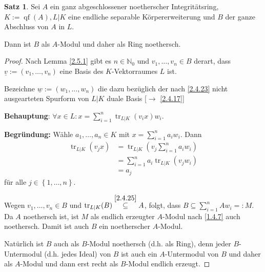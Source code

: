 \documentclass[
twoside=semi,
fontsize=12,
DIV=12, 
cleardoublepage=current,
leqno,
headings=optiontoheadandtoc, 
toc=idx
]{scrbook}
\newcommand{\N}{\mathbb{N}}
\newcommand{\brac}[1]{\left( #1 \right)}
\newcommand{\set}[1]{\left\{ #1 \right\}}
\DeclareMathOperator{\qf}{qf}
\DeclareMathOperator{\tr}{tr}
\theoremstyle{definition}
\newtheorem{satz}[definition]{Satz}
\begin{document}
 	\begin{satz}\label{2.5.2}\hfill\newline
 		Sei $A$ ein ganz abgeschlossener noetherscher Integrit\"atsring, $K:= \qf(A), L|K$ eine endliche separable K\"orpererweiterung und $B$ der ganze Abschluss von $A$ in $L$.
 		
 		\medskip\noindent 
 		Dann ist $B$ als $A$-Modul und daher als Ring noethersch.
 		
 		\begin{proof}
 			Nach Lemma \ref{2.5.1} gibt es $n \in \N_0$ und $v_1, \dots, v_n \in B$ derart, dass \linebreak $\underline{v} := (v_1, \dots, v_n)$ eine Basis des $K$-Vektorraumes $L$ ist.
 			
 			Bezeichne $\underline{w} := (w_1, \dots, w_n)$ die dazu bez\"uglich der nach \ref{2.4.23} nicht ausgearteten Spurform von $L|K$ duale Basis [$\to$ \ref{2.4.17}]
 			
 			{\color{red}
 			\noindent
 			\textbf{Behauptung}: $\forall x \in L: x = \sum_{i=1}^{n} \tr_{L|K}(v_ix)w_i$.
 			
 			\smallskip\noindent
 			\textbf{Begr\"undung: } W\"ahle $a_1, \dots, a_n \in K$ mit $x = \sum_{i=1}^{n} a_iw_i$. Dann 
 			\begin{align*}
 				\tr_{L|K}(v_jx) &= \tr_{L|K}\brac{v_j\sum_{i=1}^{n}a_iw_i}\\
 				&= \sum_{i=1}^{n} a_i\tr_{L|K}(v_jw_i)\\
 				&= a_j
 			\end{align*}
 			f\"ur alle $j \in \set{1,\dots, n}$.
 			}
 		
 			\medskip\noindent
 			Wegen $v_1, \dots, v_n \in B$ und $\tr_{L|K}(B) \overset{\ref{2.4.25}}{\subseteq} A$, folgt, dass $B \subseteq \sum_{i=1}^{n} Aw_i =: M$. Da $A$ noethersch ist,
 			ist $M$ als endlich erzeugter $A$-Modul nach \ref{1.4.7} auch noethersch. Damit ist auch $B$ ein noetherscher $A$-Modul.
 			
 			Nat\"urlich ist $B$ auch als $B$-Modul noethersch (d.h. als Ring), denn jeder $B$-Untermodul (d.h. jedes Ideal) von $B$ ist auch ein $A$-Untermodul von $B$ und daher als $A$-Modul 
 			und dann erst recht als $B$-Modul endlich erzeugt.
 		\end{proof}
 	\end{satz}
 
\end{document}
